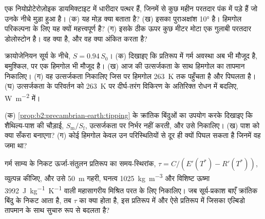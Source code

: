 \begin{exercise}[$\star\star$]\label{exo:b2:precambrian-earth:9}
एक नियोप्रोटेरोज़ोइक डायमिक्टाइट में धारीदार पत्थर हैं, जिनमें से कुछ महीन परतदार पंक में पड़े हैं
जो उनके नीचे मुड़ा हुआ है। (क) यह मोड़ क्या बताता है? (ख) इसका पुराअक्षांश
\ang{10} है। हिमगोल परिकल्पना के लिए यह क्यों महत्त्वपूर्ण है? (ग) इसके ठीक ऊपर कुछ मीटर मोटा एक
गुलाबी परतदार डोलोस्टोन है। वह क्या है, और वह क्या अंकित करता है?
\end{exercise}

\begin{exercise}[$\star\star\star$]\label{exo:b2:precambrian-earth:10}
क्रायोजेनियन सूर्य के नीचे, $S = 0.94\,S_0$। (क) दिखाइए कि प्रतिरूप में गर्म अवस्था अब भी
मौजूद है, बमुश्किल, पर एक हिमगोल भी मौजूद है। (ख) आज की उत्सर्जकता के साथ हिमगोल का तापमान
निकालिए। (ग) वह उत्सर्जकता निकालिए जिस पर हिमगोल \qty{263}{K} तक पहुँचता है और
पिघलता है। (घ) उत्सर्जकता के परिवर्तन को \qty{263}{K} पर दीर्घ-तरंग विकिरण के अतिरिक्त रोधन में
बदलिए, \unit{W.m^{-2}} में।
\end{exercise}

\begin{exercise}[$\star\star\star$]\label{exo:b2:precambrian-earth:11}
(क) \cref{prop:b2:precambrian-earth:tipping} के क्रांतिक बिंदुओं का उपयोग करके दिखाइए कि
शैथिल्य-पाश की चौड़ाई, $S_{\text{m}}/S_{\text{f}}$, उत्सर्जकता पर निर्भर नहीं करती, और
उसे निकालिए। (ख) पाश को क्या सँकरा बनाएगा? (ग) कोई हिमगोल केवल उन
परिस्थितियों से दूर ही क्यों पिघल सकता है जिनमें वह जमा था?
\end{exercise}

\begin{exercise}[$\star\star\star$]\label{exo:b2:precambrian-earth:12}
गर्म साम्य के निकट ऊर्जा-संतुलन प्रतिरूप का समय-स्थिरांक, $\tau =
C/(E'(T^*) - R'(T^*))$, व्युत्पन्न कीजिए, और उसे \qty{50}{m} गहरी, घनत्व
\qty{1025}{kg.m^{-3}} और विशिष्ट ऊष्मा \qty{3992}{J.kg^{-1}.K^{-1}} वाली महासागरीय मिश्रित परत के लिए निकालिए। जब
सूर्य-प्रकाश बाएँ क्रांतिक बिंदु के निकट आता है, तब $\tau$ का क्या होता है, इस प्रतिरूप में और ऐसे प्रतिरूप में जिसका एल्बिडो
तापमान के साथ सुचारु रूप से बदलता है?
\end{exercise}

